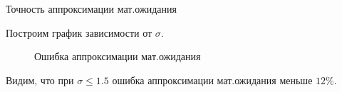 \documentclass[ucs, notheorems, handout]{beamer}
\begin{document}
\begin{frame}{Точность аппроксимации мат.ожидания}
	
	Построим график зависимости от $\sigma$.
	
	\begin{figure}[h]
		\begin{minipage}[h]{0.4\linewidth}
		\end{minipage}
		\hfill
		\begin{minipage}[h]{0.4\linewidth}
		\end{minipage}
		\caption{Ошибка аппроксимации мат.ожидания}
		\label{ris:image1}
	\end{figure}
	
	Видим, что при $\sigma\leq1.5$ ошибка аппроксимации мат.ожидания меньше $12\%$. 
	
\end{frame}
\end{document}
